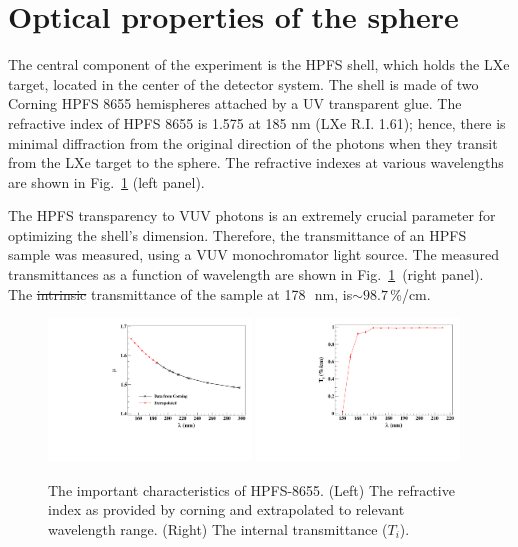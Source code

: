 \section{Optical properties of the sphere }
\label{sec:opt}

The central component of the experiment is the HPFS shell, which holds the LXe target, located in the center of the detector system. The shell is made of two Corning HPFS 8655 hemispheres attached by a UV transparent glue. The refractive index of HPFS 8655 is 1.575 at 185 nm (LXe R.I. 1.61); hence, there is minimal diffraction from the original direction of the photons when they 
transit from the LXe target to the sphere. The refractive indexes at various wavelengths are shown in Fig.~\ref{fig:hpfsRIcalibration} (left panel).


The HPFS transparency to VUV photons is an extremely crucial parameter for optimizing the shell's dimension. Therefore, the transmittance of an HPFS sample was measured, using a VUV monochromator light source. 
The measured transmittances as a function of wavelength are shown in Fig.~\ref{fig:hpfsRIcalibration}~(right panel). The \sout{intrinsic} transmittance of the sample at 178~\,nm, is$\sim98.7$\,\%/cm.  

\begin{figure}[h]
   \centering
   \includegraphics[width=0.48\textwidth]{RI-calibration.pdf}
    \includegraphics[width=0.48\textwidth]{IntTransmittance.pdf}
   \caption{The important characteristics of HPFS-8655. (Left) The refractive index as provided by corning and 
   extrapolated to relevant wavelength range. (Right) The internal transmittance ($T_{i}$).} 
   \label{fig:hpfsRIcalibration}
\end{figure}


